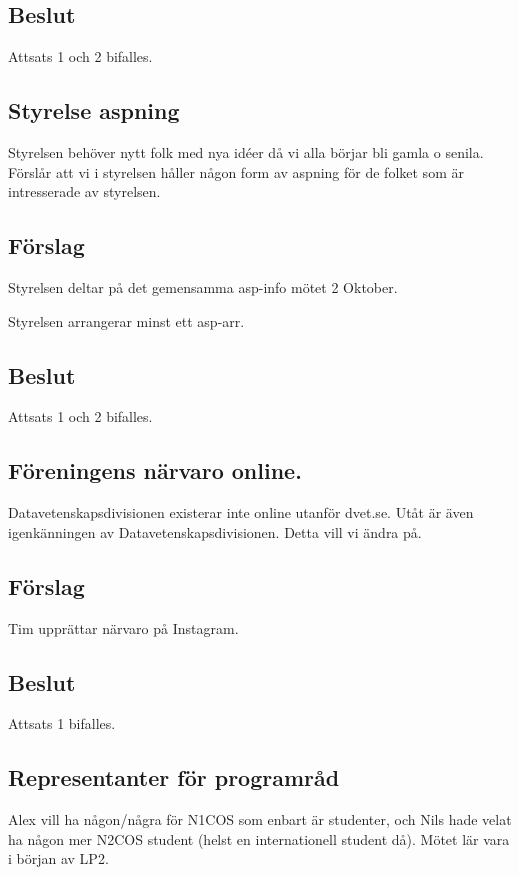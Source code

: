 \documentclass[protokoll]{dvd}
\begin{document}
\subsection{Beslut}
Attsats 1 och 2 bifalles.

\subsection*{Styrelse aspning}
Styrelsen behöver nytt folk med nya idéer då vi alla börjar bli gamla o senila. Förslår att vi i styrelsen håller någon form av aspning för de folket som är intresserade av styrelsen.

\subsection{Förslag}
\begin{attsatser}
    \item Styrelsen deltar på det gemensamma asp-info mötet 2 Oktober.
    \item Styrelsen arrangerar minst ett asp-arr.
\end{attsatser}
\subsection{Beslut}
Attsats 1 och 2 bifalles.


\subsection*{Föreningens närvaro online.}
Datavetenskapsdivisionen existerar inte online utanför dvet.se. Utåt är även igenkänningen av Datavetenskapsdivisionen. Detta vill vi ändra på.
\subsection{Förslag}
\begin{attsatser}
    \item Tim upprättar närvaro på Instagram. 
\end{attsatser}
\subsection{Beslut}
Attsats 1 bifalles.

\subsection*{Representanter för programråd}
Alex vill ha någon/några för N1COS som enbart är studenter, och Nils hade velat ha någon mer N2COS student (helst en internationell student då).
Mötet lär vara i början av LP2.
\end{document}
